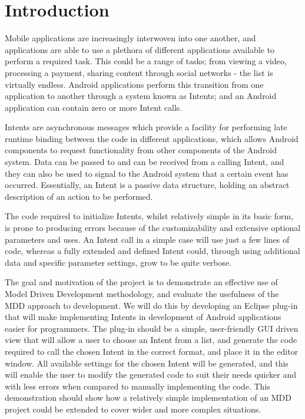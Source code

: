 \section{Introduction}

Mobile applications are increasingly interwoven into one another, and applications are able to use a plethora of different applications available to perform a required task. This could be a range of tasks; from viewing a video, processing a payment, sharing content through social networks - the list is virtually endless. Android applications perform this transition from one application to another through a system known as Intents; and an Android application can contain zero or more Intent calls.

Intents are asynchronous messages which provide a facility for performing late runtime binding between the code in different applications, which allows Android components to request functionality from other components of the Android system. Data can be passed to and can be received from a calling Intent, and they can also be used to signal to the Android system that a certain event has occurred. Essentially, an Intent is a passive data structure, holding an abstract description of an action to be performed. 

The code required to initialize Intents, whilst relatively simple in its basic form, is prone to producing errors because of the customizability and extensive optional parameters and uses. An Intent call in a simple case will use just a few lines of code, whereas a fully extended and defined Intent could, through using additional data and specific parameter settings, grow to be quite verbose. 

The goal and motivation of the project is to demonstrate an effective use of Model Driven Development methodology, and evaluate the usefulness of the MDD approach to development. We will do this by developing an Eclipse plug-in that will make implementing Intents in development of Android applications easier for programmers. The plug-in should be a simple, user-friendly GUI driven view that will allow a user to choose an Intent from a list, and generate the code required to call the chosen Intent in the correct format, and place it in the editor window. All available settings for the chosen Intent will be generated, and this will enable the user to modify the generated code to suit their needs quicker and with less errors when compared to manually implementing the code. This demonstration should show how a relatively simple implementation of an MDD project could be extended to cover wider and more complex situations.

